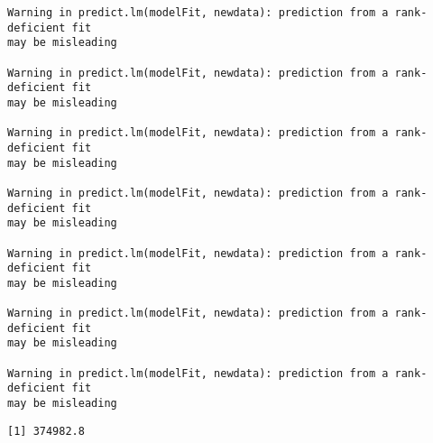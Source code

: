 \documentclass[
  letterpaper,
  DIV=11,
  numbers=noendperiod]{scrartcl}
\begin{document}
\begin{verbatim}
Warning in predict.lm(modelFit, newdata): prediction from a rank-deficient fit
may be misleading

Warning in predict.lm(modelFit, newdata): prediction from a rank-deficient fit
may be misleading

Warning in predict.lm(modelFit, newdata): prediction from a rank-deficient fit
may be misleading

Warning in predict.lm(modelFit, newdata): prediction from a rank-deficient fit
may be misleading

Warning in predict.lm(modelFit, newdata): prediction from a rank-deficient fit
may be misleading

Warning in predict.lm(modelFit, newdata): prediction from a rank-deficient fit
may be misleading

Warning in predict.lm(modelFit, newdata): prediction from a rank-deficient fit
may be misleading
\end{verbatim}

\begin{verbatim}
[1] 374982.8
\end{verbatim}
\end{document}
